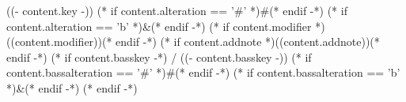 ((- content.key -))
(* if content.alteration == '#' *)#(* endif -*)
(* if content.alteration == 'b' *)&(* endif -*)
(* if content.modifier *)((content.modifier))(* endif -*)
(* if content.addnote *)((content.addnote))(* endif -*)
(* if content.basskey -*)
    /
    ((- content.basskey -))
    (* if content.bassalteration == '#' *)#(* endif -*)
    (* if content.bassalteration == 'b' *)&(* endif -*)
(* endif -*)
